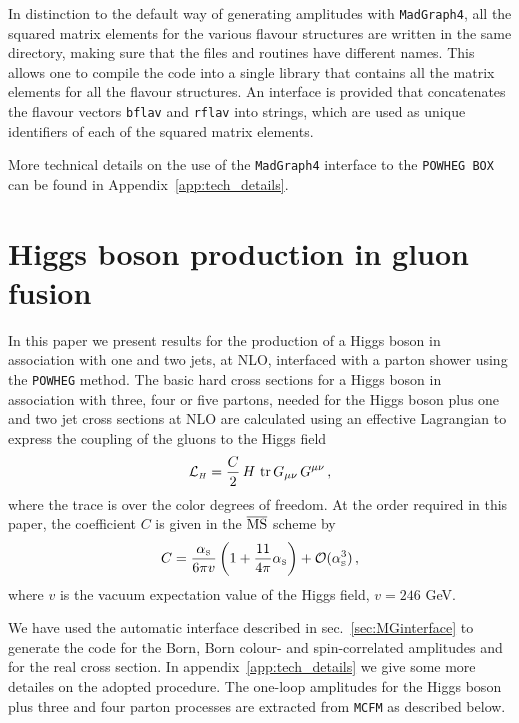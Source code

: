 \documentclass[paper]{JHEP3}
\def\tr{\mathop{\rm tr}\nolimits}
\def\({\left(}
\def\){\right)}
\newcommand\sss{\mathchoice%
{\displaystyle}%
{\scriptstyle}%
{\scriptscriptstyle}%
{\scriptscriptstyle}%
}
\newcommand\as{\alpha_{\sss\rm S}}
\newcommand\POWHEG{{\tt POWHEG}}
\newcommand\POWHEGBOX{{\tt POWHEG BOX}}
\newcommand\MG{{\tt MadGraph4}}
\newcommand\MCFM{{\tt MCFM}}
\begin{document}
%
In distinction to the default way of generating amplitudes with \MG,
all the squared matrix elements for the various flavour structures are
written in the same directory, making sure that the files and routines
have different names. This allows one to compile the code into a
single library that contains all the matrix elements for all the
flavour structures. An interface is provided that concatenates the
flavour vectors \verb|bflav| and \verb|rflav| into strings, which are
used as unique identifiers of each of the squared matrix elements.


More technical details on the use of the \MG{} interface to the \POWHEGBOX{}
can be found in Appendix~\ref{app:tech_details}.


\section{Higgs boson production in gluon fusion}
In this paper we present results for the production of a Higgs boson in
association with one and two jets, at NLO, interfaced with a parton shower
using the \POWHEG{} method.  The basic hard cross sections for a Higgs boson
in association with three, four or five partons, needed for the Higgs boson
plus one and two jet cross sections at NLO are calculated using an effective
Lagrangian to express the coupling of the gluons to the Higgs
field~\cite{Wilczek:1977zn}
\begin{equation} 
\label{EffLag}
\mathcal{L}_{\sss H} = \frac{C}{2} \, H\,\tr
G_{\mu\nu}\,G^{\mu\nu}\,,
\end{equation}
where the trace is over the color degrees of freedom.  At the order required
in this paper, the coefficient $C$ is given in the $\overline{\rm MS}$ scheme
by~\cite{Djouadi:1991tka,Dawson:1990zj}
\begin{equation}
C =\frac{\as}{6 \pi v} \( 1 +\frac{11}{4 \pi} \as\)
 + {\cal O}(\as^3) \,,
\end{equation}
where $v$ is the vacuum expectation value of the Higgs field, $v = 246$ GeV.


We have used the automatic interface described in sec.~\ref{sec:MGinterface} to
generate the code for the Born, Born colour- and spin-correlated amplitudes
and for the real cross section. In appendix~\ref{app:tech_details} we give
some more detailes on the adopted procedure. The
one-loop amplitudes for the Higgs boson plus three and four parton processes
are extracted from \MCFM{} as described below.
\end{document}
